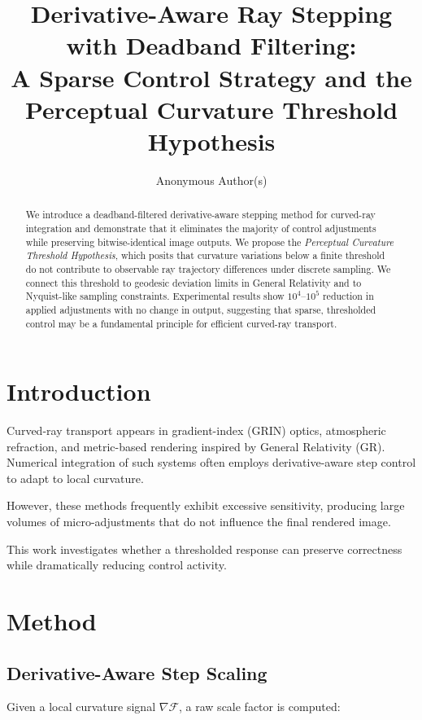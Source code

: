 \documentclass[11pt]{article}
\title{Derivative-Aware Ray Stepping with Deadband Filtering:\\
A Sparse Control Strategy and the Perceptual Curvature Threshold Hypothesis}
\author{Anonymous Author(s)}
\date{}
\begin{document}
\maketitle

\begin{abstract}
We introduce a deadband-filtered derivative-aware stepping method for curved-ray integration and demonstrate that it eliminates the majority of control adjustments while preserving bitwise-identical image outputs. We propose the \textit{Perceptual Curvature Threshold Hypothesis}, which posits that curvature variations below a finite threshold do not contribute to observable ray trajectory differences under discrete sampling. We connect this threshold to geodesic deviation limits in General Relativity and to Nyquist-like sampling constraints. Experimental results show $10^4$--$10^5$ reduction in applied adjustments with no change in output, suggesting that sparse, thresholded control may be a fundamental principle for efficient curved-ray transport.
\end{abstract}

\section{Introduction}

Curved-ray transport appears in gradient-index (GRIN) optics, atmospheric refraction, and metric-based rendering inspired by General Relativity (GR). Numerical integration of such systems often employs derivative-aware step control to adapt to local curvature.

However, these methods frequently exhibit excessive sensitivity, producing large volumes of micro-adjustments that do not influence the final rendered image.

This work investigates whether a thresholded response can preserve correctness while dramatically reducing control activity.

\section{Method}

\subsection{Derivative-Aware Step Scaling}

Given a local curvature signal $\nabla \mathcal{F}$, a raw scale factor is computed:
\end{document}
